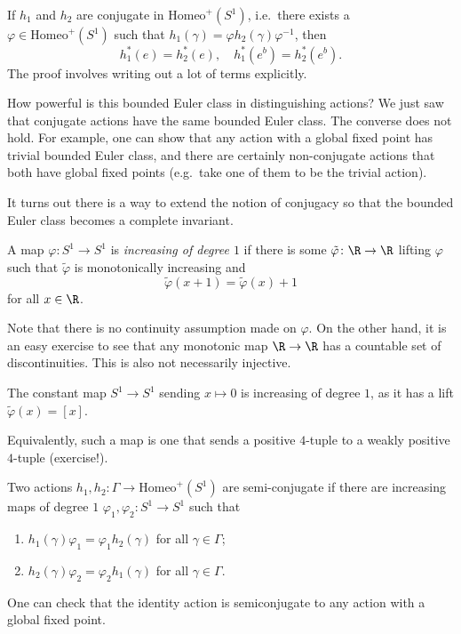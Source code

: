 \documentclass[a4paper]{article}
\newcommand\Homeo{\mathrm{Homeo}}
\begin{document}
\begin{ex}
  If $h_1$ and $h_2$ are conjugate in $\Homeo^+(S^1)$, i.e.\ there exists a $\varphi \in \Homeo^+(S^1)$ such that $h_1(\gamma) = \varphi h_2(\gamma) \varphi^{-1}$, then
  \[
    h_1^*(e) = h_2^*(e),\quad h_1^*(e^b) = h_2^*(e^b).
  \]
  The proof involves writing out a lot of terms explicitly.
\end{ex}

How powerful is this bounded Euler class in distinguishing actions? We just saw that conjugate actions have the same bounded Euler class. The converse does not hold. For example, one can show that any action with a global fixed point has trivial bounded Euler class, and there are certainly non-conjugate actions that both have global fixed points (e.g.\ take one of them to be the trivial action).

It turns out there is a way to extend the notion of conjugacy so that the bounded Euler class becomes a complete invariant.

\begin{defi}
  A map $\varphi\colon S^1 \to S^1$ is \emph{increasing of degree $1$} if there is some $\tilde{\varphi}\colon \R \to \R$ lifting $\varphi$ such that $\tilde{\varphi}$ is monotonically increasing and
  \[
    \tilde{\varphi}(x + 1) = \tilde{\varphi}(x) + 1
  \]
  for all $x \in \R$.
\end{defi}
Note that there is no continuity assumption made on $\varphi$. On the other hand, it is an easy exercise to see that any monotonic map $\R \to \R$ has a countable set of discontinuities. This is also not necessarily injective.

\begin{eg}
  The constant map $S^1 \to S^1$ sending $x \mapsto 0$ is increasing of degree $1$, as it has a lift $\tilde{\varphi}(x) = [x]$.
\end{eg}

Equivalently, such a map is one that sends a positive $4$-tuple to a weakly positive $4$-tuple (exercise!). %

\begin{defi}
  Two actions $h_1, h_2\colon \Gamma \to \Homeo^+(S^1)$ are semi-conjugate if there are increasing maps of degree $1$ $\varphi_1, \varphi_2\colon S^1 \to S^1$ such that
  \begin{enumerate}
    \item $h_1(\gamma) \varphi_1 = \varphi_1 h_2(\gamma)$ for all $\gamma \in \Gamma$;
    \item $h_2(\gamma) \varphi_2 = \varphi_2 h_1(\gamma)$ for all $\gamma \in \Gamma$.
  \end{enumerate}
\end{defi}
One can check that the identity action is semiconjugate to any action with a global fixed point.
\end{document}
